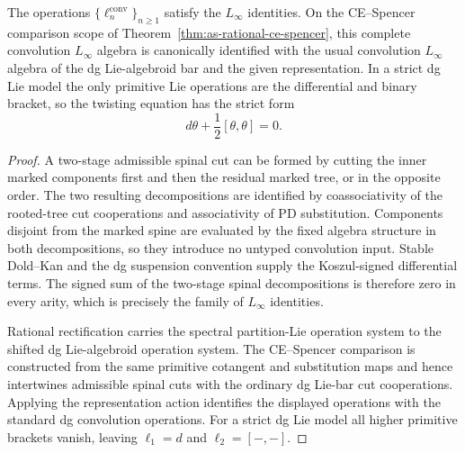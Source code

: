 \begin{proposition}
\label{prop:as-convolution-linfty-identities}
The operations
$\{\ell_n^{\mathrm{conv}}\}_{n\ge1}$ satisfy the $L_\infty$ identities.  On
the CE--Spencer comparison scope of
Theorem~\ref{thm:as-rational-ce-spencer}, this complete convolution
$L_\infty$ algebra is canonically identified with the usual convolution
$L_\infty$ algebra of the dg Lie-algebroid bar and the given representation.
In a strict dg Lie model the only primitive Lie operations are the
differential and binary bracket, so the twisting equation has the strict form
\[
    d\theta+\frac12[\theta,\theta]=0.
\]
\end{proposition}

\begin{proof}
A two-stage admissible spinal cut can be formed by cutting the inner marked
components first and then the residual marked tree, or in the opposite order.
The two resulting decompositions are identified by coassociativity of the
rooted-tree cut cooperations and associativity of PD substitution.  Components
disjoint from the marked spine are evaluated by the fixed algebra structure
in both decompositions, so they introduce no untyped convolution input.
Stable Dold--Kan and the dg suspension convention supply the Koszul-signed
differential terms.  The signed sum of the two-stage spinal decompositions is
therefore zero in every arity, which is precisely the family of $L_\infty$
identities.

Rational rectification carries the spectral partition-Lie operation system to
the shifted dg Lie-algebroid operation system.  The CE--Spencer comparison is
constructed from the same primitive cotangent and substitution maps and hence
intertwines admissible spinal cuts with the ordinary dg Lie-bar cut
cooperations.  Applying the representation action identifies the displayed
operations with the standard dg convolution operations.  For a strict dg Lie
model all higher primitive brackets vanish, leaving $\ell_1=d$ and
$\ell_2=[-,-]$.
\end{proof}


